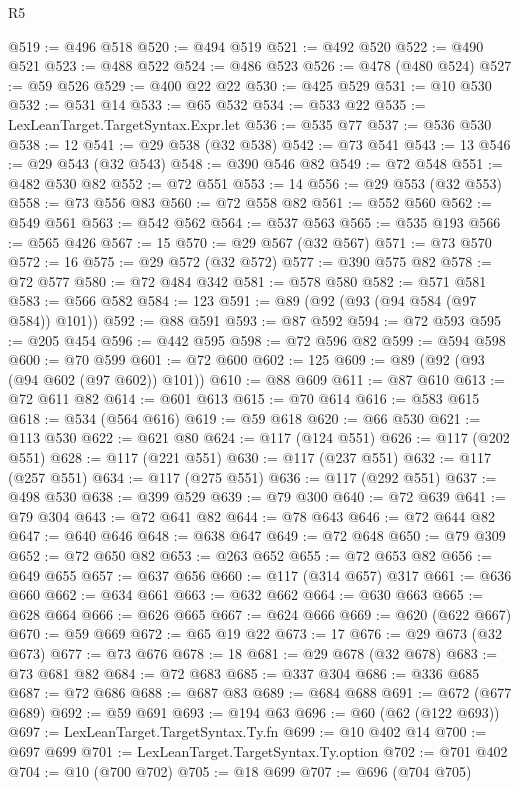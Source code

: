 \begin{lexlean}{R5}
\begin{coremodule}
{{{{{{{{{{{{{{{{{{{{{{{{{{{{{{{{{{{{{{{{{{{{{{{{{{{{{{{{{{{{{{{{{{{{{{{{{{{{{{{{{{{{{{{{{{{{@519 := @496 @518
@520 := @494 @519
@521 := @492 @520
@522 := @490 @521
@523 := @488 @522
@524 := @486 @523
@526 := @478 (@480 @524)
@527 := @59 @526
@529 := @400 @22 @22
@530 := @425 @529
@531 := @10 @530
@532 := @531 @14
@533 := @65 @532
@534 := @533 @22
@535 := LexLeanTarget.TargetSyntax.Expr.let
@536 := @535 @77
@537 := @536 @530
@538 := 12
@541 := @29 @538 (@32 @538)
@542 := @73 @541
@543 := 13
@546 := @29 @543 (@32 @543)
@548 := @390 @546 @82
@549 := @72 @548
@551 := @482 @530 @82
@552 := @72 @551
@553 := 14
@556 := @29 @553 (@32 @553)
@558 := @73 @556 @83
@560 := @72 @558 @82
@561 := @552 @560
@562 := @549 @561
@563 := @542 @562
@564 := @537 @563
@565 := @535 @193
@566 := @565 @426
@567 := 15
@570 := @29 @567 (@32 @567)
@571 := @73 @570
@572 := 16
@575 := @29 @572 (@32 @572)
@577 := @390 @575 @82
@578 := @72 @577
@580 := @72 @484 @342
@581 := @578 @580
@582 := @571 @581
@583 := @566 @582
@584 := 123
@591 := @89 (@92 (@93 (@94 @584 (@97 @584)) @101))
@592 := @88 @591
@593 := @87 @592
@594 := @72 @593
@595 := @205 @454
@596 := @442 @595
@598 := @72 @596 @82
@599 := @594 @598
@600 := @70 @599
@601 := @72 @600
@602 := 125
@609 := @89 (@92 (@93 (@94 @602 (@97 @602)) @101))
@610 := @88 @609
@611 := @87 @610
@613 := @72 @611 @82
@614 := @601 @613
@615 := @70 @614
@616 := @583 @615
@618 := @534 (@564 @616)
@619 := @59 @618
@620 := @66 @530
@621 := @113 @530
@622 := @621 @80
@624 := @117 (@124 @551)
@626 := @117 (@202 @551)
@628 := @117 (@221 @551)
@630 := @117 (@237 @551)
@632 := @117 (@257 @551)
@634 := @117 (@275 @551)
@636 := @117 (@292 @551)
@637 := @498 @530
@638 := @399 @529
@639 := @79 @300
@640 := @72 @639
@641 := @79 @304
@643 := @72 @641 @82
@644 := @78 @643
@646 := @72 @644 @82
@647 := @640 @646
@648 := @638 @647
@649 := @72 @648
@650 := @79 @309
@652 := @72 @650 @82
@653 := @263 @652
@655 := @72 @653 @82
@656 := @649 @655
@657 := @637 @656
@660 := @117 (@314 @657) @317
@661 := @636 @660
@662 := @634 @661
@663 := @632 @662
@664 := @630 @663
@665 := @628 @664
@666 := @626 @665
@667 := @624 @666
@669 := @620 (@622 @667)
@670 := @59 @669
@672 := @65 @19 @22
@673 := 17
@676 := @29 @673 (@32 @673)
@677 := @73 @676
@678 := 18
@681 := @29 @678 (@32 @678)
@683 := @73 @681 @82
@684 := @72 @683
@685 := @337 @304
@686 := @336 @685
@687 := @72 @686
@688 := @687 @83
@689 := @684 @688
@691 := @672 (@677 @689)
@692 := @59 @691
@693 := @194 @63
@696 := @60 (@62 (@122 @693))
@697 := LexLeanTarget.TargetSyntax.Ty.fn
@699 := @10 @402 @14
@700 := @697 @699
@701 := LexLeanTarget.TargetSyntax.Ty.option
@702 := @701 @402
@704 := @10 (@700 @702)
@705 := @18 @699
@707 := @696 (@704 @705)
}}}}}}}}}}}}}}}}}}}}}}}}}}}}}}}}}}}}}}}}}}}}}}}}}}}}}}}}}}}}}}}}}}}}}}}}}}}}}}}}}}}}}}}}}}}}
\end{coremodule}
\end{lexlean}
